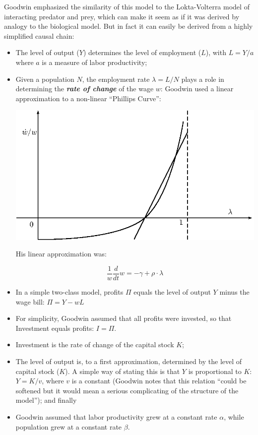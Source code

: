 Goodwin emphasized the similarity of this model to the Lokta-Volterra
model of interacting predator and prey, which can make it seem as
if it was derived by analogy to the biological model. But in fact
it can easily be derived from a highly simplified causal chain:
\begin{itemize}
\item The level of output ($Y$) determines the level of employment ($L$),
with $L=Y/a$ where $a$ is a measure of labor productivity; 
\item Given a population $N$, the employment rate $\lambda=L/N$ plays
a role in determining the \textbf{\em rate of change} of the wage
$w$: Goodwin used a linear approximation to a non-linear ``Phillips
Curve'':


\begin{center}
\includegraphics{images/PhillipsCurve} 
\par\end{center}

His linear approximation was:

\[
\frac{1}{w}\frac{d}{dt}w=-\gamma+\rho\cdot\lambda
\]

\item In a simple two-class model, profits $\Pi$ equals the level of output
$Y$ minus the wage bill: $\Pi=Y-wL$ 
\item For simplicity, Goodwin assumed that all profits were invested, so
that Investment equals profits: $I=\Pi$. 
\item Investment is the rate of change of the capital stock $K$; 
\item The level of output is, to a first approximation, determined by the
level of capital stock ($K$). A simple way of stating this is that
$Y$ is proportional to $K$: $Y=K/v$, where $v$ is a constant (Goodwin
notes that this relation ``could be softened but it would mean a
serious complicating of the structure of the model''); and finally 
\item Goodwin assumed that labor productivity grew at a constant rate $\alpha$,
while population grew at a constant rate $\beta$.


\end{itemize}
